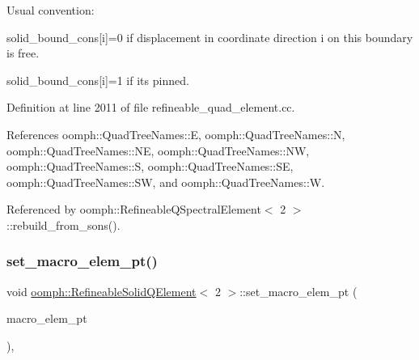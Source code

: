Usual convention\+:
\begin{DoxyItemize}
\item solid\+\_\+bound\+\_\+cons\mbox{[}i\mbox{]}=0 if displacement in coordinate direction i on this boundary is free.
\item solid\+\_\+bound\+\_\+cons\mbox{[}i\mbox{]}=1 if it\textquotesingle{}s pinned. 
\end{DoxyItemize}

Definition at line 2011 of file refineable\+\_\+quad\+\_\+element.\+cc.



References oomph\+::\+Quad\+Tree\+Names\+::E, oomph\+::\+Quad\+Tree\+Names\+::N, oomph\+::\+Quad\+Tree\+Names\+::\+NE, oomph\+::\+Quad\+Tree\+Names\+::\+NW, oomph\+::\+Quad\+Tree\+Names\+::S, oomph\+::\+Quad\+Tree\+Names\+::\+SE, oomph\+::\+Quad\+Tree\+Names\+::\+SW, and oomph\+::\+Quad\+Tree\+Names\+::W.



Referenced by oomph\+::\+Refineable\+Q\+Spectral\+Element$<$ 2 $>$\+::rebuild\+\_\+from\+\_\+sons().

\mbox{\label{classoomph_1_1RefineableSolidQElement_3_012_01_4_aac8a230631c509dd854d71a5f68b6483}} 
\subsubsection{\texorpdfstring{set\+\_\+macro\+\_\+elem\+\_\+pt()}{set\_macro\_elem\_pt()}\hspace{0.1cm}{\footnotesize\ttfamily [1/2]}}
{\footnotesize\ttfamily void \hyperlink{classoomph_1_1RefineableSolidQElement}{oomph\+::\+Refineable\+Solid\+Q\+Element}$<$ 2 $>$\+::set\+\_\+macro\+\_\+elem\+\_\+pt (\begin{DoxyParamCaption}\item[{\hyperlink{classoomph_1_1MacroElement}{Macro\+Element} $\ast$}]{macro\+\_\+elem\+\_\+pt }\end{DoxyParamCaption})\hspace{0.3cm}{\ttfamily [inline]}, {\ttfamily [virtual]}}



